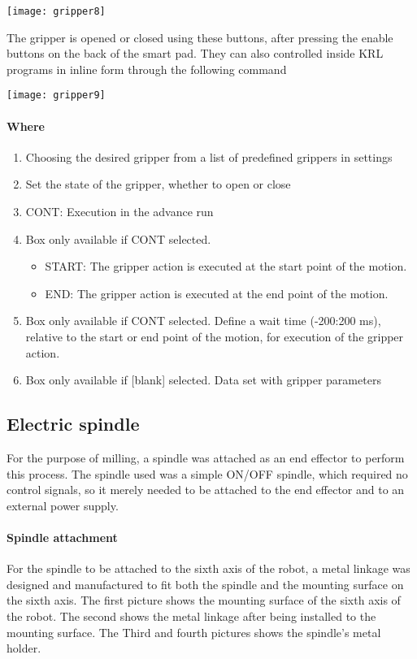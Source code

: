  	\begin{center}
 		\texttt{[image: gripper8]} 
 	\end{center}
 
 The gripper is opened or closed using these buttons, after pressing the enable buttons on the back of the smart pad. They can also controlled inside KRL programs in inline form through the following command
 \begin{center}
 	\texttt{[image: gripper9]}
 \end{center}
 
 	\paragraph{Where}
 	\begin{enumerate}
 		\item Choosing the desired gripper from a list of predefined grippers in settings
 		\item Set the state of the gripper, whether to open or close
 		\item CONT: Execution in the advance run
 		\item Box only available if CONT selected.
 			\begin{itemize}
 				\item START: The gripper action is executed at the start point of the motion.
 				\item END: The gripper action is executed at the end point of the motion.
 			\end{itemize}
 		\item Box only available if CONT selected.
 			Define a wait time (-200:200 ms), relative to the start or end point of the motion, for execution of the gripper action.
 		\item Box only available if [blank] selected.
 		Data set with gripper parameters
 	\end{enumerate}
 
 \subsection{Electric spindle}
 For the purpose of milling, a spindle was attached as an end effector to perform this process. The spindle used was a simple ON/OFF spindle, which required no control signals, so it merely needed to be attached to the end effector and to an external power supply. 
 
 \paragraph{Spindle attachment }
 For the spindle to be attached to the sixth axis of the robot, a metal linkage was designed and manufactured to fit both the spindle and the mounting surface on the sixth axis. The first picture shows the mounting surface of the sixth axis of the robot. The second shows the metal linkage after being installed to the mounting surface. The Third and fourth pictures shows the spindle’s metal holder. 
 

